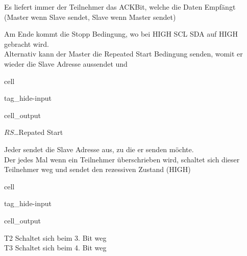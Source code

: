 \documentclass[letterpaper,10pt,english]{jupyterBook}
\begin{document}
\sphinxAtStartPar
Es liefert immer der Teilnehmer das ACK\sphinxhyphen{}Bit,
welche die Daten Empfängt (Master wenn Slave sendet, Slave wenn Master sendet)

\sphinxAtStartPar
Am Ende kommt die Stopp Bedingung,
wo bei HIGH SCL SDA auf HIGH gebracht wird.\\
Alternativ kann der Master die Repeated Start Bedingung senden,
womit er wieder die Slave Adresse aussendet und

\begin{sphinxuseclass}{cell}
\begin{sphinxuseclass}{tag_hide-input}\begin{sphinxVerbatimOutput}

\begin{sphinxuseclass}{cell_output}
\noindent{}

\end{sphinxuseclass}\end{sphinxVerbatimOutput}

\end{sphinxuseclass}
\end{sphinxuseclass}
\sphinxAtStartPar
\(RS\)…Repated Start

\begin{DUlineblock}{0em}
\item[] 
\end{DUlineblock}

\sphinxAtStartPar
Jeder sendet die Slave Adresse aus,
zu die er senden möchte.\\
Der jedes Mal wenn ein Teilnehmer überschrieben wird,
schaltet sich dieser Teilnehmer weg
und sendet den rezessiven Zustand (HIGH)

\begin{sphinxuseclass}{cell}
\begin{sphinxuseclass}{tag_hide-input}\begin{sphinxVerbatimOutput}

\begin{sphinxuseclass}{cell_output}
\noindent{}

\end{sphinxuseclass}\end{sphinxVerbatimOutput}

\end{sphinxuseclass}
\end{sphinxuseclass}
\sphinxAtStartPar
T2 Schaltet sich beim 3. Bit weg\\
T3 Schaltet sich beim 4. Bit weg
\end{document}

